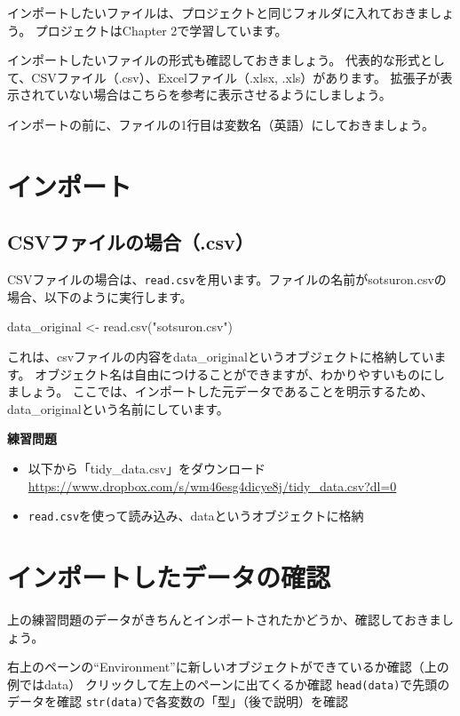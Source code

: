 \documentclass[
]{book}
\newenvironment{Shaded}{\begin{snugshade}}{\end{snugshade}}
\newcommand{\FunctionTok}[1]{\textcolor[rgb]{0.00,0.00,0.00}{#1}}
\newcommand{\NormalTok}[1]{#1}
\newcommand{\OtherTok}[1]{\textcolor[rgb]{0.56,0.35,0.01}{#1}}
\newcommand{\StringTok}[1]{\textcolor[rgb]{0.31,0.60,0.02}{#1}}
\providecommand{\tightlist}{%
  \setlength{\itemsep}{0pt}\setlength{\parskip}{0pt}}
\begin{document}
インポートしたいファイルは、プロジェクトと同じフォルダに入れておきましょう。 プロジェクトはChapter 2で学習しています。

インポートしたいファイルの形式も確認しておきましょう。 代表的な形式として、CSVファイル（.csv）、Excelファイル（.xlsx, .xls）があります。 拡張子が表示されていない場合はこちらを参考に表示させるようにしましょう。

インポートの前に、ファイルの1行目は変数名（英語）にしておきましょう。

\hypertarget{ux30a4ux30f3ux30ddux30fcux30c8}{%
\section{インポート}\label{ux30a4ux30f3ux30ddux30fcux30c8}}

\hypertarget{csvux30d5ux30a1ux30a4ux30ebux306eux5834ux5408.csv}{%
\subsection{CSVファイルの場合（.csv）}\label{csvux30d5ux30a1ux30a4ux30ebux306eux5834ux5408.csv}}

CSVファイルの場合は、\texttt{read.csv}を用います。ファイルの名前がsotsuron.csvの場合、以下のように実行します。

\begin{Shaded}
\begin{Highlighting}[]
\NormalTok{data\_original }\OtherTok{\textless{}{-}} \FunctionTok{read.csv}\NormalTok{(}\StringTok{"sotsuron.csv"}\NormalTok{)}
\end{Highlighting}
\end{Shaded}

これは、csvファイルの内容をdata\_originalというオブジェクトに格納しています。 オブジェクト名は自由につけることができますが、わかりやすいものにしましょう。 ここでは、インポートした元データであることを明示するため、data\_originalという名前にしています。

\textbf{練習問題}

\begin{itemize}
\tightlist
\item
  以下から「tidy\_data.csv」をダウンロード
  \url{https://www.dropbox.com/s/wm46esg4dicye8j/tidy_data.csv?dl=0}\\
\item
  \texttt{read.csv}を使って読み込み、dataというオブジェクトに格納
\end{itemize}

\hypertarget{ux30a4ux30f3ux30ddux30fcux30c8ux3057ux305fux30c7ux30fcux30bfux306eux78baux8a8d}{%
\section{インポートしたデータの確認}\label{ux30a4ux30f3ux30ddux30fcux30c8ux3057ux305fux30c7ux30fcux30bfux306eux78baux8a8d}}

上の練習問題のデータがきちんとインポートされたかどうか、確認しておきましょう。

右上のペーンの``Environment''に新しいオブジェクトができているか確認（上の例ではdata）
クリックして左上のペーンに出てくるか確認
\texttt{head(data)}で先頭のデータを確認
\texttt{str(data)}で各変数の「型」（後で説明）を確認

  
\end{document}
